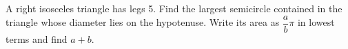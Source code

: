 A right isosceles triangle has legs 5. Find the largest semicircle contained in the triangle whose diameter lies on the hypotenuse. Write its area as $\dfrac{a}{b}\pi$ in lowest terms and find $a+b$.
